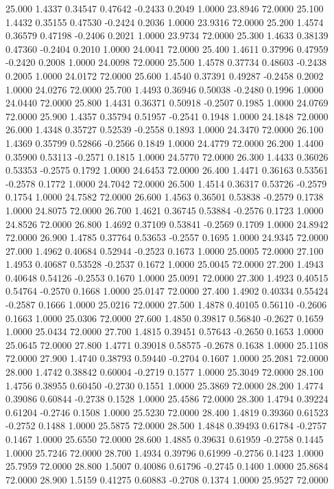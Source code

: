   25.000   1.4337   0.34547   0.47642  -0.2433   0.2049   1.0000  23.8946  72.0000
  25.100   1.4432   0.35155   0.47530  -0.2424   0.2036   1.0000  23.9316  72.0000
  25.200   1.4574   0.36579   0.47198  -0.2406   0.2021   1.0000  23.9734  72.0000
  25.300   1.4633   0.38139   0.47360  -0.2404   0.2010   1.0000  24.0041  72.0000
  25.400   1.4611   0.37996   0.47959  -0.2420   0.2008   1.0000  24.0098  72.0000
  25.500   1.4578   0.37734   0.48603  -0.2438   0.2005   1.0000  24.0172  72.0000
  25.600   1.4540   0.37391   0.49287  -0.2458   0.2002   1.0000  24.0276  72.0000
  25.700   1.4493   0.36946   0.50038  -0.2480   0.1996   1.0000  24.0440  72.0000
  25.800   1.4431   0.36371   0.50918  -0.2507   0.1985   1.0000  24.0769  72.0000
  25.900   1.4357   0.35794   0.51957  -0.2541   0.1948   1.0000  24.1848  72.0000
  26.000   1.4348   0.35727   0.52539  -0.2558   0.1893   1.0000  24.3470  72.0000
  26.100   1.4369   0.35799   0.52866  -0.2566   0.1849   1.0000  24.4779  72.0000
  26.200   1.4400   0.35900   0.53113  -0.2571   0.1815   1.0000  24.5770  72.0000
  26.300   1.4433   0.36026   0.53353  -0.2575   0.1792   1.0000  24.6453  72.0000
  26.400   1.4471   0.36163   0.53561  -0.2578   0.1772   1.0000  24.7042  72.0000
  26.500   1.4514   0.36317   0.53726  -0.2579   0.1754   1.0000  24.7582  72.0000
  26.600   1.4563   0.36501   0.53838  -0.2579   0.1738   1.0000  24.8075  72.0000
  26.700   1.4621   0.36745   0.53884  -0.2576   0.1723   1.0000  24.8526  72.0000
  26.800   1.4692   0.37109   0.53841  -0.2569   0.1709   1.0000  24.8942  72.0000
  26.900   1.4785   0.37764   0.53653  -0.2557   0.1695   1.0000  24.9345  72.0000
  27.000   1.4962   0.40684   0.52944  -0.2523   0.1673   1.0000  25.0005  72.0000
  27.100   1.4953   0.40687   0.53528  -0.2537   0.1672   1.0000  25.0045  72.0000
  27.200   1.4943   0.40648   0.54126  -0.2553   0.1670   1.0000  25.0091  72.0000
  27.300   1.4923   0.40515   0.54764  -0.2570   0.1668   1.0000  25.0147  72.0000
  27.400   1.4902   0.40334   0.55424  -0.2587   0.1666   1.0000  25.0216  72.0000
  27.500   1.4878   0.40105   0.56110  -0.2606   0.1663   1.0000  25.0306  72.0000
  27.600   1.4850   0.39817   0.56840  -0.2627   0.1659   1.0000  25.0434  72.0000
  27.700   1.4815   0.39451   0.57643  -0.2650   0.1653   1.0000  25.0645  72.0000
  27.800   1.4771   0.39018   0.58575  -0.2678   0.1638   1.0000  25.1108  72.0000
  27.900   1.4740   0.38793   0.59440  -0.2704   0.1607   1.0000  25.2081  72.0000
  28.000   1.4742   0.38842   0.60004  -0.2719   0.1577   1.0000  25.3049  72.0000
  28.100   1.4756   0.38955   0.60450  -0.2730   0.1551   1.0000  25.3869  72.0000
  28.200   1.4774   0.39086   0.60844  -0.2738   0.1528   1.0000  25.4586  72.0000
  28.300   1.4794   0.39224   0.61204  -0.2746   0.1508   1.0000  25.5230  72.0000
  28.400   1.4819   0.39360   0.61523  -0.2752   0.1488   1.0000  25.5875  72.0000
  28.500   1.4848   0.39493   0.61784  -0.2757   0.1467   1.0000  25.6550  72.0000
  28.600   1.4885   0.39631   0.61959  -0.2758   0.1445   1.0000  25.7246  72.0000
  28.700   1.4934   0.39796   0.61999  -0.2756   0.1423   1.0000  25.7959  72.0000
  28.800   1.5007   0.40086   0.61796  -0.2745   0.1400   1.0000  25.8684  72.0000
  28.900   1.5159   0.41275   0.60883  -0.2708   0.1374   1.0000  25.9527  72.0000
